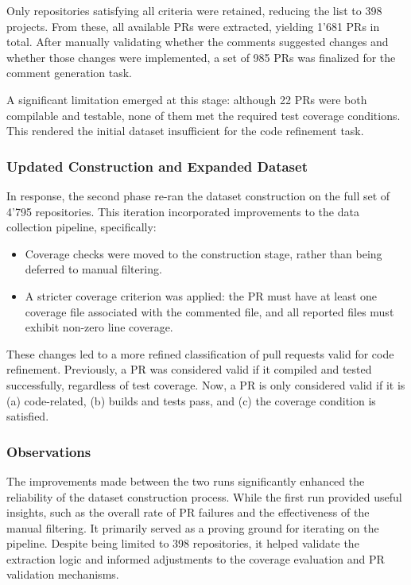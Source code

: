 Only repositories satisfying all criteria were retained, reducing the list to 398 projects. From
these, all available PRs were extracted, yielding 1'681 PRs in total. After manually validating
whether the comments suggested changes and whether those changes were implemented, a set of 985 PRs
was finalized for the comment generation task.

A significant limitation emerged at this stage: although 22 PRs were both compilable and testable,
none of them met the required test coverage conditions. This rendered the initial dataset
insufficient for the code refinement task.

\subsubsection{Updated Construction and Expanded Dataset}

In response, the second phase re-ran the dataset construction on the full set of 4'795 repositories.
This iteration incorporated improvements to the data collection pipeline, specifically:

\begin{itemize}
	\item Coverage checks were moved to the construction stage, rather than being deferred to manual
	      filtering.
	\item A stricter coverage criterion was applied: the PR must have at least one coverage file
	      associated with the commented file, and all reported files must exhibit non-zero line
	      coverage.
\end{itemize}

These changes led to a more refined classification of pull requests valid for code refinement.
Previously, a PR was considered valid if it compiled and tested successfully, regardless of test
coverage. Now, a PR is only considered valid if it is (a) code-related, (b) builds and tests pass,
and (c) the coverage condition is satisfied.

\subsubsection{Observations}

The improvements made between the two runs significantly enhanced the reliability of the dataset
construction process. While the first run provided useful insights, such as the overall rate of PR
failures and the effectiveness of the manual filtering. It primarily served as a proving ground for
iterating on the pipeline. Despite being limited to 398 repositories, it helped validate the
extraction logic and informed adjustments to the coverage evaluation and PR validation mechanisms.

